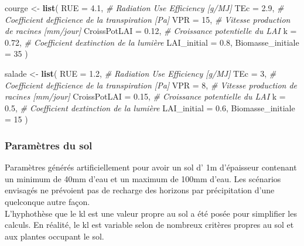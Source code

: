 \documentclass[
]{article}
\newenvironment{Shaded}{\begin{snugshade}}{\end{snugshade}}
\newcommand{\AttributeTok}[1]{\textcolor[rgb]{0.13,0.29,0.53}{#1}}
\newcommand{\CommentTok}[1]{\textcolor[rgb]{0.56,0.35,0.01}{\textit{#1}}}
\newcommand{\DecValTok}[1]{\textcolor[rgb]{0.00,0.00,0.81}{#1}}
\newcommand{\FloatTok}[1]{\textcolor[rgb]{0.00,0.00,0.81}{#1}}
\newcommand{\FunctionTok}[1]{\textcolor[rgb]{0.13,0.29,0.53}{\textbf{#1}}}
\newcommand{\NormalTok}[1]{#1}
\newcommand{\OtherTok}[1]{\textcolor[rgb]{0.56,0.35,0.01}{#1}}
\begin{document}
\begin{Shaded}
\begin{Highlighting}[]
\NormalTok{courge }\OtherTok{\textless{}{-}} \FunctionTok{list}\NormalTok{(}
  \AttributeTok{RUE               =} \FloatTok{4.1}\NormalTok{,   }\CommentTok{\# Radiation Use Efficiency [g/MJ]}
  \AttributeTok{TEc               =} \FloatTok{2.9}\NormalTok{,   }\CommentTok{\# Coefficient d\textquotesingle{}efficience de la transpiration [Pa]}
  \AttributeTok{VPR               =} \DecValTok{15}\NormalTok{,    }\CommentTok{\# Vitesse production de racines [mm/jour]}
  \AttributeTok{CroissPotLAI      =} \FloatTok{0.12}\NormalTok{,  }\CommentTok{\# Croissance potentielle du LAI }
  \AttributeTok{k                 =} \FloatTok{0.72}\NormalTok{,  }\CommentTok{\# Coefficient d\textquotesingle{}extinction de la lumière}
  \AttributeTok{LAI\_initial       =} \FloatTok{0.8}\NormalTok{,   }
  \AttributeTok{Biomasse\_initiale =} \DecValTok{35}
\NormalTok{)}


\NormalTok{salade }\OtherTok{\textless{}{-}} \FunctionTok{list}\NormalTok{(}
  \AttributeTok{RUE               =} \FloatTok{1.2}\NormalTok{,   }\CommentTok{\# Radiation Use Efficiency [g/MJ]}
  \AttributeTok{TEc               =} \DecValTok{3}\NormalTok{,     }\CommentTok{\# Coefficient d\textquotesingle{}efficience de la transpiration [Pa]}
  \AttributeTok{VPR               =} \DecValTok{8}\NormalTok{,     }\CommentTok{\# Vitesse production de racines [mm/jour]}
  \AttributeTok{CroissPotLAI      =} \FloatTok{0.15}\NormalTok{,  }\CommentTok{\# Croissance potentielle du LAI }
  \AttributeTok{k                 =} \FloatTok{0.5}\NormalTok{,   }\CommentTok{\# Coefficient d\textquotesingle{}extinction de la lumière}
  \AttributeTok{LAI\_initial       =} \FloatTok{0.6}\NormalTok{,   }
  \AttributeTok{Biomasse\_initiale =} \DecValTok{15}     
\NormalTok{)}
\end{Highlighting}
\end{Shaded}

\subsubsection{Paramètres du sol}\label{paramuxe8tres-du-sol}

Paramètres générés artificiellement pour avoir un sol d' 1m d'épaisseur
contenant un minimum de 40mm d'eau et un maximum de 100mm d'eau. Les
scénarios envisagés ne prévoient pas de recharge des horizons par
précipitation d'une quelconque autre façon.\\
L'hyphothèse que le kl est une valeur propre au sol a été posée pour
simplifier les calculs. En réalité, le kl est variable selon de nombreux
critères propres au sol et aux plantes occupant le sol.
\end{document}
